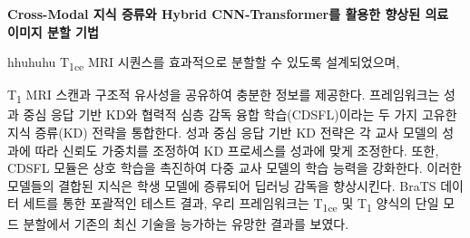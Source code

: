 \newcommand{\thesisTitleKorean}{Cross-Modal 지식 증류와 Hybrid CNN-Transformer를 활용한 향상된 의료 이미지 분할 기법}

{\centering \Large \bf \thesisTitleKorean \par} \vspace{1.0cm}

hhuhuhu T\textsubscript{1ce} MRI 시퀀스를 효과적으로 분할할 수 있도록 설계되었으며, 


T\textsubscript{1} MRI 스캔과 구조적 유사성을 공유하여 충분한 정보를 제공한다. 
프레임워크는 성과 중심 응답 기반 KD와 협력적 심층 감독 융합 학습(CDSFL)이라는 두 가지 고유한 지식 증류(KD) 전략을 통합한다. 성과 중심 응답 기반 KD 전략은 각 교사 모델의 성과에 따라 신뢰도 가중치를 조정하여 KD 프로세스를 성과에 맞게 조정한다. 또한, CDSFL 모듈은 상호 학습을 촉진하여 다중 교사 모델의 학습 능력을 강화한다. 이러한 모델들의 결합된 지식은 학생 모델에 증류되어 딥러닝 감독을 향상시킨다. BraTS 데이터 세트를 통한 포괄적인 테스트 결과, 우리 프레임워크는 T\textsubscript{1ce} 및 T\textsubscript{1} 양식의 단일 모드 분할에서 기존의 최신 기술을 능가하는 유망한 결과를 보였다.